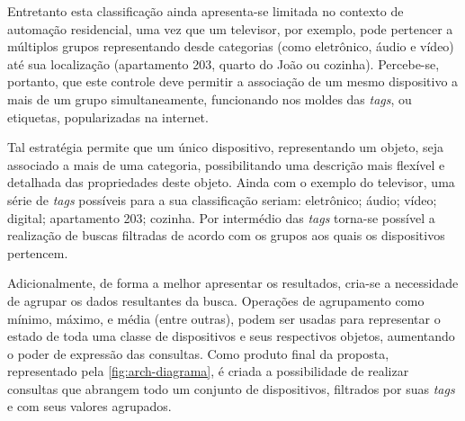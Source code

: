 \documentclass[twoside,english,brazilian]{UNISINOSmonografia}
\begin{document}
Entretanto esta classificação ainda apresenta-se limitada no contexto de 
automação residencial, uma vez que um televisor, por exemplo, pode pertencer a 
múltiplos grupos representando desde categorias (como eletrônico, áudio e 
vídeo) até sua localização (apartamento 203, quarto do João ou cozinha).
Percebe-se, portanto, que este controle deve permitir a associação de um mesmo 
dispositivo a mais de um grupo simultaneamente, funcionando nos moldes das 
\textit{tags}, ou etiquetas, popularizadas na internet.


Tal estratégia permite que um único dispositivo, representando um objeto, seja 
associado a mais de uma categoria, possibilitando uma descrição mais flexível 
e detalhada das propriedades deste objeto.
Ainda com o exemplo do televisor, uma série de \textit{tags} possíveis para a 
sua classificação seriam: eletrônico; áudio; vídeo; digital; apartamento 203;
cozinha.
Por intermédio das \textit{tags} torna-se possível a realização de buscas 
filtradas de acordo com os grupos aos quais os dispositivos pertencem.


Adicionalmente, de forma a melhor apresentar os resultados, cria-se a 
necessidade de agrupar os dados resultantes da busca.
Operações de agrupamento como mínimo, máximo, e média (entre outras), podem 
ser usadas para representar o estado de toda uma classe de dispositivos e seus 
respectivos objetos, aumentando o poder de expressão das consultas.
Como produto final da proposta, representado pela \autoref{fig:arch-diagrama}, 
é criada a possibilidade de realizar consultas que abrangem 
todo um conjunto de dispositivos, filtrados por suas \textit{tags} e com seus 
valores agrupados.
\end{document}
